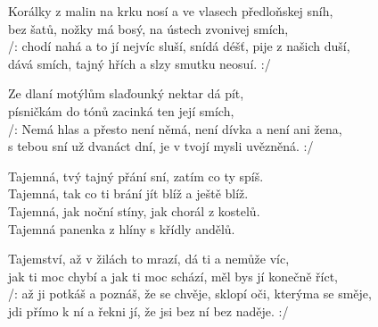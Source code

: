 
\ve{}
Korálky z malin na krku nosí a ve vlasech předloňskej sníh,\\
bez šatů, nožky má bosý, na ústech zvonivej smích,\\
/: chodí nahá a to jí nejvíc sluší, snídá déšť, pije z našich duší,\\
dává smích, tajný hřích a slzy smutku neosuí. :/

\ve{}
Ze dlaní motýlům slaďounký nektar dá pít,\\
písničkám do tónů zacinká ten její smích,\\
/: Nemá hlas a přesto není němá, není dívka a není ani žena,\\
s tebou sní už dvanáct dní, je v tvojí mysli uvězněná. :/

\cho{}
Tajemná, tvý tajný přání sní, zatím co ty spíš.\\
Tajemná, tak co ti brání jít blíž a ještě blíž.\\
Tajemná, jak noční stíny, jak chorál z kostelů.\\
Tajemná panenka z hlíny s křídly andělů.

\ve{}
Tajemství, až v žilách to mrazí, dá ti a nemůže víc,\\
jak ti moc chybí a jak ti moc schází, měl bys jí konečně říct,\\
/: až ji potkáš a poznáš, že se chvěje, sklopí oči, kterýma se směje,\\
jdi přímo k ní a řekni jí, že jsi bez ní bez naděje. :/
\esong